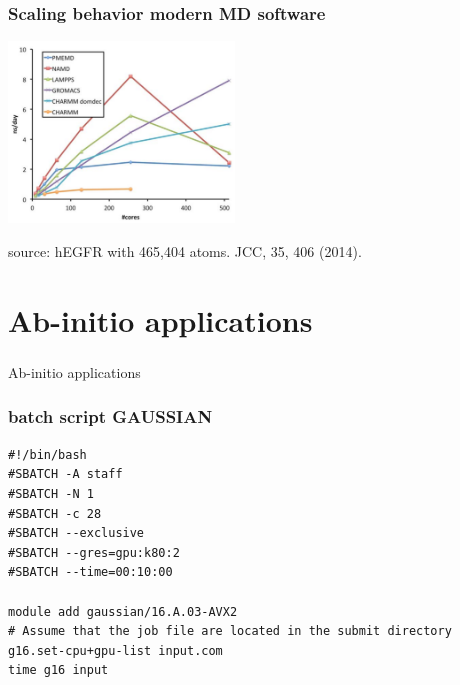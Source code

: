 
\begin{frame}
	\frametitle{Scaling behavior modern MD software}
        \begin{center}
		\includegraphics[width=6cm]{images/software_scaling.png}
        \end{center}

{\tiny
source: hEGFR with 465,404 atoms. JCC, 35, 406 (2014).
}
\end{frame}



\section{Ab-initio applications}
\begin{frame}
	\frametitle{}
\begin{center}
{\Huge Ab-initio applications}
\end{center}
\end{frame}

\begin{frame}[fragile]
	\frametitle{batch script GAUSSIAN}
  
        \begin{verbatim}             
#!/bin/bash
#SBATCH -A staff
#SBATCH -N 1
#SBATCH -c 28
#SBATCH --exclusive
#SBATCH --gres=gpu:k80:2
#SBATCH --time=00:10:00

module add gaussian/16.A.03-AVX2
# Assume that the job file are located in the submit directory
g16.set-cpu+gpu-list input.com
time g16 input

        \end{verbatim}

\end{frame}

